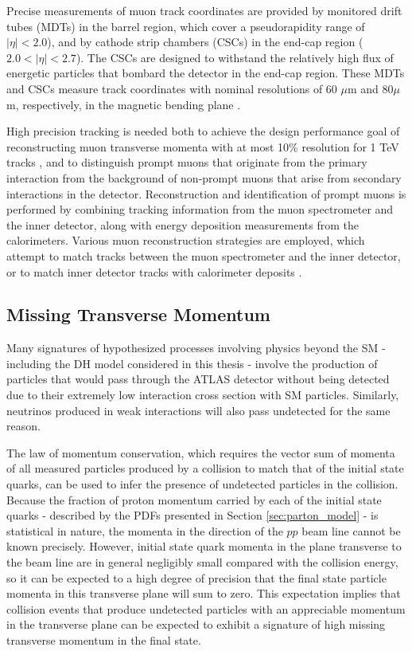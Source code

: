 Precise measurements of muon track coordinates are provided by monitored drift tubes (MDTs) in the barrel region, which cover a pseudorapidity range of \(|\eta|<2.0\)), and by cathode strip chambers (CSCs) in the end-cap region (\(2.0<|\eta|<2.7\)). The CSCs are designed to withstand the relatively high flux of energetic particles that bombard the detector in the end-cap region. These MDTs and CSCs measure track coordinates with nominal resolutions of 60 \(\mu\)m and 80\(\mu\)m, respectively, in the magnetic bending plane \cite{muon_reco}. 

High precision tracking is needed both to achieve the design performance goal of reconstructing muon transverse momenta with at most 10\% resolution for 1 TeV tracks \cite{atlas}, and to distinguish prompt muons that originate from the primary interaction from the background of non-prompt muons that arise from secondary interactions in the detector. Reconstruction and identification of prompt muons is performed by combining tracking information from the muon spectrometer and the inner detector, along with energy deposition measurements from the calorimeters. Various muon reconstruction strategies are employed, which attempt to match tracks between the muon spectrometer and the inner detector, or to match inner detector tracks with calorimeter deposits \cite{muon_reco}.

\subsection{Missing Transverse Momentum}
\label{sec:met}

Many signatures of hypothesized processes involving physics beyond the SM - including the DH model considered in this thesis - involve the production of particles that would pass through the ATLAS detector without being detected due to their extremely low interaction cross section with SM particles. Similarly, neutrinos produced in weak interactions will also pass undetected for the same reason. 

The law of momentum conservation, which requires the vector sum of momenta of all measured particles produced by a collision to match that of the initial state quarks, can be used to infer the presence of undetected particles in the collision. Because the fraction of proton momentum carried by each of the initial state quarks - described by the PDFs presented in Section \ref{sec:parton_model} - is statistical in nature, the momenta in the direction of the \(pp\) beam line cannot be known precisely. However, initial state quark momenta in the plane transverse to the beam line are in general negligibly small compared with the collision energy, so it can be expected to a high degree of precision that the final state particle momenta in this transverse plane will sum to zero. This expectation implies that collision events that produce undetected particles with an appreciable momentum in the transverse plane can be expected to exhibit a signature of high missing transverse momentum in the final state. 

